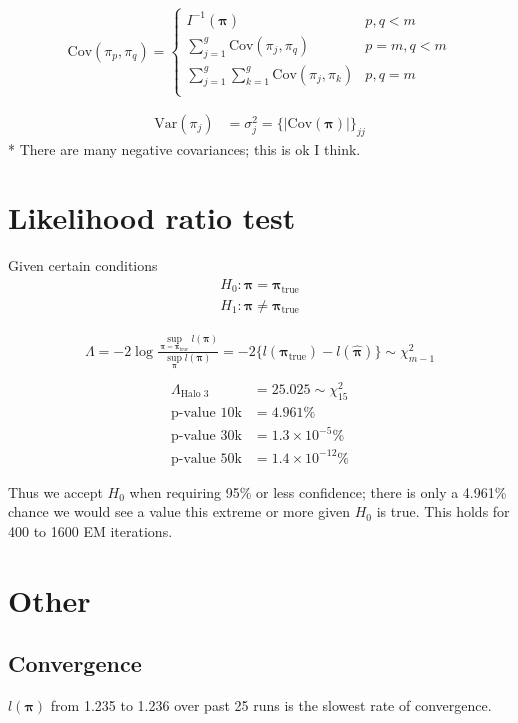 \documentclass[12pt]{amsart}
\newcommand{\vect}[1]{\boldsymbol{\mathbf{#1}}}
\newcommand{\eqn}[1]{\begin{align*}
#1
\end{align*}}
\newcommand{\bl}{\big\{}
\newcommand{\br}{\big\}}
\newcommand{\Bl}{\Big\{}
\newcommand{\Br}{\Big\}}
\newcommand{\eqnset}[4]{
\[ #1 = #2 \left\{ \begin{array}{#3}
        #4
\end{array} \right. \] 
}
\newcommand{\vp}{\vect{\pi}}
\newcommand{\vph}{\hat{\vect{\pi}}}
\newcommand{\llp}{l(\vect{\pi})}
\begin{document}
\eqnset{\text{Cov}(\pi_p,\pi_q)}{}{ll}{
	I^{-1}(\vph) 				& p,q<m	\\
	\sum\limits_{j=1}^g \text{Cov}(\pi_j,\pi_q)		& p=m,q<m	\\
	\sum\limits_{j=1}^g \sum\limits_{k=1}^g \text{Cov}(\pi_j,\pi_k)		& p, q=m	\\
}

\eqn{
	\text{Var}(\pi_j) &= \sigma^2_j = \Bl \big | \text{Cov}(\vp) \big | \Br_{jj}
}
* There are many negative covariances; this is ok I think.









\clearpage
\section{Likelihood ratio test}
Given certain conditions
\eqn{
	H_0: \vp = \vp_\text{true}	\\
	H_1: \vp \neq \vp_\text{true}
}

\eqn{
	\Lambda = -2 \log \frac{ \sup_{\vp=\vp_\text{true}} \llp}{ \sup_{\vp} \llp }  = -2\bl l(\vp_\text{true}) - l(\vph) \br \sim \chi^2_{m-1}	\\
}
\eqn{
	\Lambda_\text{Halo 3} &= 25.025 \sim \chi^2_{15}	\\
	\text{p-value 10k} &= 4.961\%\\
	\text{p-value 30k} &= 1.3\times 10^{-5}\%\\
	\text{p-value 50k} &= 1.4\times 10^{-12}\%
}

Thus we accept $H_0$ when requiring 95\% or less confidence; there is only a 4.961\% chance we would see a value this extreme or more given $H_0$ is true. This holds for 400 to 1600 EM iterations.

















\clearpage
\section{Other}
\subsection{Convergence}
$\llp$ from 1.235 to 1.236 over past 25 runs is the slowest rate of convergence.
\end{document}
